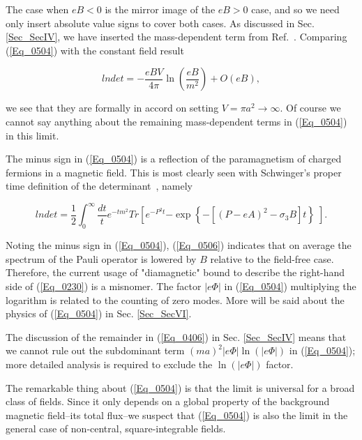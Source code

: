 \documentclass[a4paper,twocolumn,showpacs,preprintnumbers,amsmath,amssymb]{revtex4}
\newcommand{\half}{\frac{1}{2}}
\begin{document}
\noindent
The case when $eB < 0$ is the mirror image of the $eB > 0$ case, and so
we need only insert absolute value signs to cover both cases. As
discussed in Sec. \ref{Sec_SecIV}, we have inserted the mass-dependent
term from Ref.~\cite{Fry00b}. Comparing (\ref{Eq_0504}) with the constant
field result

\begin{equation}
\label{Eq_0505}
lndet = - \frac{eBV}{4\pi} \ln\left(\frac{eB}{m^2}\right) + O(eB),
\end{equation}

\noindent
we see that they are formally in accord on setting
$V = \pi a^2 \to \infty$. Of course we cannot say anything about the
remaining mass-dependent terms in (\ref{Eq_0504}) in this limit.

The minus sign in (\ref{Eq_0504}) is a reflection of the paramagnetism
of charged fermions in a magnetic field. This is most clearly seen
with Schwinger's proper time definition of the
determinant~\cite{Schwinger51}, namely

\begin{widetext}
\begin{equation}
\label{Eq_0506}
lndet = \half \int^{\infty}_0 \frac{dt}{t} e^{-tm^2} Tr
  \left[
  e^{-P^2 t}
  \right.
  \left.
  - \exp\left\{-[(P-eA)^2 - \sigma_3 B]t\right\} \;
  \right].
\end{equation}
\end{widetext}

\noindent
Noting the minus sign in (\ref{Eq_0504}), (\ref{Eq_0506})
indicates that on average the spectrum of the Pauli operator is
lowered by $B$ relative to the field-free case. Therefore, the current
usage of "diamagnetic" bound to describe the right-hand side of
(\ref{Eq_0230}) is a misnomer. The factor $|e\Phi|$ in (\ref{Eq_0504})
multiplying the logarithm is related to the counting of zero
modes. More will be said about the physics of (\ref{Eq_0504}) in
Sec. \ref{Sec_SecVI}.

The discussion of the remainder in (\ref{Eq_0406}) in
Sec. \ref{Sec_SecIV} means that we cannot rule out the subdominant
term $(ma)^2 |e\Phi| \ln(|e\Phi|)$ in (\ref{Eq_0504}); more detailed
analysis is required to exclude the $\ln(|e\Phi|)$ factor.

The remarkable thing about (\ref{Eq_0504}) is that the limit is
universal for a broad class of fields. Since it only depends on a
global property of the background magnetic field--its total flux--we
suspect that (\ref{Eq_0504}) is also the limit in the general case of
non-central, square-integrable fields.
\end{document}
